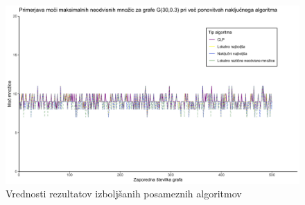\documentclass[a4paper, 12pt]{article}
\begin{document}
\begin{figure}[h!]
	\begin{center}
		\includegraphics[scale = 0.12]{R_koda/pon-moc-maximalno.png}
		\caption{Vrednosti rezultatov izboljšanih posameznih algoritmov}
	\end{center}
\end{figure}
\end{document}

